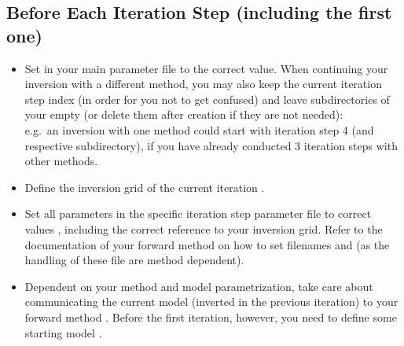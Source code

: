 \subsection*{Before Each Iteration Step (including the first one)}
%
\begin{itemize}
\item Set 
in your main parameter file to the correct value. When continuing your inversion with a different method, you
may also keep the current iteration step index (in order for you not to get confused) and leave 
subdirectories of your  empty (or delete them after creation if they 
are not needed):\\
e.g.\ an inversion with one method could start with iteration step 4 (and respective subdirectory), 
if you have already conducted 3 iteration steps with other methods.
%
\item Define the inversion grid of the current iteration .
%
\item Set all parameters in the specific iteration step parameter file to correct values 
, including the correct reference to your inversion grid.
Refer to the documentation of your forward method on how to set filenames 
and  (as the handling of these file are method dependent).
%
\item Dependent on your method and model parametrization, take care about communicating the current
model (inverted in the previous iteration) to your forward method . 
Before the first iteration, however, you need to define some starting model .
%
\end{itemize}
%
